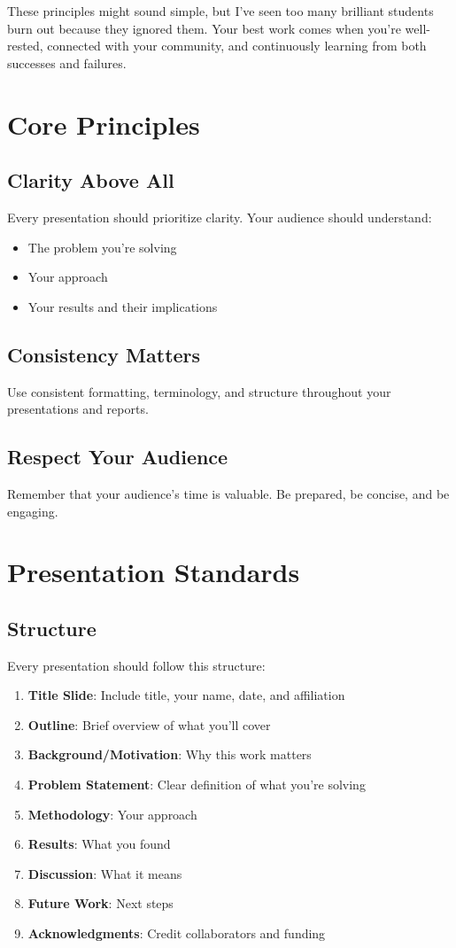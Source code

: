 \documentclass[11pt,a4paper]{article}
\begin{document}
These principles might sound simple, but I've seen too many brilliant students burn out because they ignored them. Your best work comes when you're well-rested, connected with your community, and continuously learning from both successes and failures.

\section{Core Principles}

\subsection{Clarity Above All}
Every presentation should prioritize clarity. Your audience should understand:
\begin{itemize}
    \item The problem you're solving
    \item Your approach
    \item Your results and their implications
\end{itemize}

\subsection{Consistency Matters}
Use consistent formatting, terminology, and structure throughout your presentations and reports.

\subsection{Respect Your Audience}
Remember that your audience's time is valuable. Be prepared, be concise, and be engaging.

\section{Presentation Standards}

\subsection{Structure}
Every presentation should follow this structure:
\begin{enumerate}
    \item \textbf{Title Slide}: Include title, your name, date, and affiliation
    \item \textbf{Outline}: Brief overview of what you'll cover
    \item \textbf{Background/Motivation}: Why this work matters
    \item \textbf{Problem Statement}: Clear definition of what you're solving
    \item \textbf{Methodology}: Your approach
    \item \textbf{Results}: What you found
    \item \textbf{Discussion}: What it means
    \item \textbf{Future Work}: Next steps
    \item \textbf{Acknowledgments}: Credit collaborators and funding
\end{enumerate}
\end{document}
